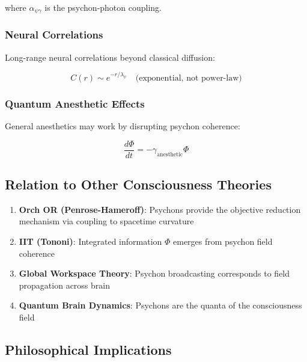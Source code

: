 where $\alpha_{\psi\gamma}$ is the psychon-photon coupling.

\subsubsection{Neural Correlations}

Long-range neural correlations beyond classical diffusion:

\begin{equation}
C(r) \sim e^{-r/\lambda_\psi} \quad \text{(exponential, not power-law)}
\end{equation}

\subsubsection{Quantum Anesthetic Effects}

General anesthetics may work by disrupting psychon coherence:

\begin{equation}
\frac{d\Phi}{dt} = -\gamma_{\text{anesthetic}} \Phi
\end{equation}

\subsection{Relation to Other Consciousness Theories}

\begin{enumerate}
    \item \textbf{Orch OR (Penrose-Hameroff)}: Psychons provide the objective reduction mechanism via coupling to spacetime curvature
    
    \item \textbf{IIT (Tononi)}: Integrated information $\Phi$ emerges from psychon field coherence
    
    \item \textbf{Global Workspace Theory}: Psychon broadcasting corresponds to field propagation across brain
    
    \item \textbf{Quantum Brain Dynamics}: Psychons are the quanta of the consciousness field
\end{enumerate}

\subsection{Philosophical Implications}

